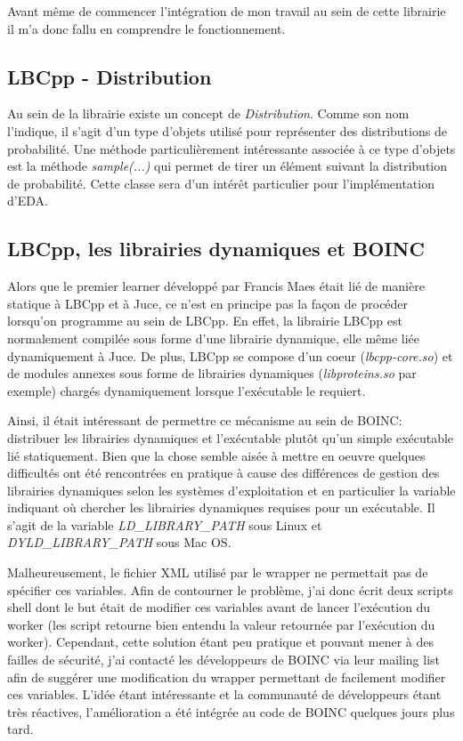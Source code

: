 \documentclass[a4paper, 11pt]{article}
\begin{document}
Avant même de commencer l'intégration de mon travail au sein de cette librairie il m'a donc fallu en comprendre le fonctionnement.

\subsection{LBCpp - Distribution}
Au sein de la librairie existe un concept de \textit{Distribution}. Comme son nom l'indique, il s'agit d'un type d'objets utilisé pour représenter des distributions de probabilité. Une méthode particulièrement intéressante associée à ce type d'objets est la méthode \textit{sample(...)} qui permet de tirer un élément suivant la distribution de probabilité. Cette classe sera d'un intérêt particulier pour l'implémentation d'EDA.

\subsection{LBCpp, les librairies dynamiques et BOINC}
Alors que le premier learner développé par Francis Maes était lié de manière statique à LBCpp et à Juce, ce n'est en principe pas la façon de procéder lorsqu'on programme au sein de LBCpp. En effet, la librairie LBCpp est normalement compilée sous forme d'une librairie dynamique, elle même liée dynamiquement à Juce. De plus, LBCpp se compose d'un coeur (\textit{lbcpp-core.so}) et de modules annexes sous forme de librairies dynamiques (\textit{libproteins.so} par exemple) chargés dynamiquement lorsque l'exécutable le requiert.

Ainsi, il était intéressant de permettre ce mécanisme au sein de \textsc{BOINC}: distribuer les librairies dynamiques et l'exécutable plutôt qu'un simple exécutable lié statiquement. Bien que la chose semble aisée à mettre en oeuvre quelques difficultés ont été rencontrées en pratique à cause des différences de gestion des librairies dynamiques selon les systèmes d'exploitation et en particulier la variable indiquant où chercher les librairies dynamiques requises pour un exécutable. Il s'agit de la variable \textit{LD\_LIBRARY\_PATH} sous Linux et \textit{DYLD\_LIBRARY\_PATH} sous Mac OS. 

Malheureusement, le fichier XML utilisé par le wrapper ne permettait pas de spécifier ces variables. Afin de contourner le problème, j'ai donc écrit deux scripts shell dont le but était de modifier ces variables avant de lancer l'exécution du worker (les script retourne bien entendu la valeur retournée par l'exécution du worker). Cependant, cette solution étant peu pratique et pouvant mener à des failles de sécurité, j'ai contacté les développeurs de \textsc{BOINC} via leur mailing list afin de suggérer une modification du wrapper permettant de facilement modifier ces variables. L'idée étant intéressante et la communauté de développeurs étant très réactives, l'amélioration a été intégrée au code de \textsc{BOINC} quelques jours plus tard. %
\end{document}
